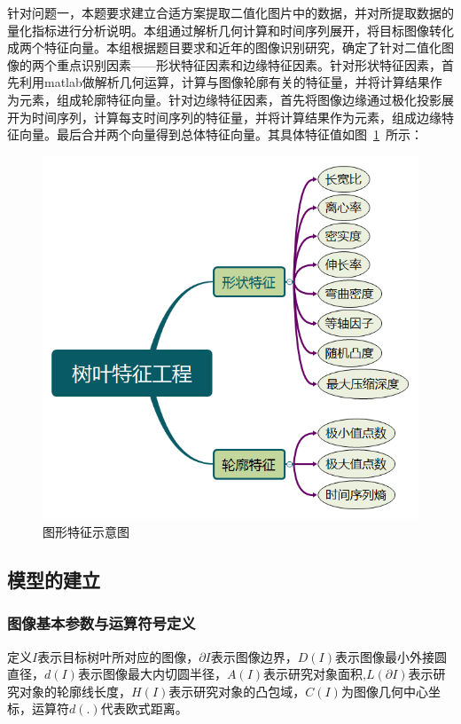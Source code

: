 \documentclass{whutmod}
\begin{document}
	针对问题一，本题要求建立合适方案提取二值化图片中的数据，并对所提取数据的量化指标进行分析说明。本组通过解析几何计算和时间序列展开，将目标图像转化成两个特征向量。本组根据题目要求和近年的图像识别研究，确定了针对二值化图像的两个重点识别因素——形状特征因素和边缘特征因素。针对形状特征因素，首先利用matlab做解析几何运算，计算与图像轮廓有关的特征量，并将计算结果作为元素，组成轮廓特征向量。针对边缘特征因素，首先将图像边缘通过极化投影展开为时间序列，计算每支时间序列的特征量，并将计算结果作为元素，组成边缘特征向量。最后合并两个向量得到总体特征向量。其具体特征值如图~\ref{77}~所示：
	    \begin{figure}[H]
		\centering
		\includegraphics[width=.6\textwidth]{figures/flt.png}
		\caption{图形特征示意图}\label{77}
    	\end{figure}
	
	    \subsection{模型的建立}
	    \subsubsection{图像基本参数与运算符号定义}
		定义$I$表示目标树叶所对应的图像，$\partial I$表示图像边界，$D(I)$表示图像最小外接圆直径，$d(I)$表示图像最大内切圆半径，$A(I)$表示研究对象面积,$L(\partial I)$表示研究对象的轮廓线长度，$H(I)$表示研究对象的凸包域，$C(I)$为图像几何中心坐标，运算符$d(.)$代表欧式距离。
\end{document}
